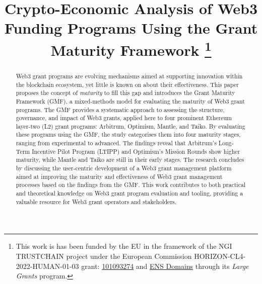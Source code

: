 \documentclass[conference]{IEEEtran}
\begin{document}
\title{Crypto-Economic Analysis of Web3 Funding Programs Using the Grant Maturity Framework
\thanks{This work is has been funded by the EU in the framework of the NGI TRUSTCHAIN project under the European Commission HORIZON-CL4-2022-HUMAN-01-03 grant: \href{https://cordis.europa.eu/project/id/101093274}{101093274} and \href{https://ens.domains/}{ENS Domains} through its \textit{Large Grants} program.}
}
\author{

\and
{}

\and
{}
}
\maketitle

\begin{abstract}
Web3 grant programs are evolving mechanisms aimed at supporting innovation within the blockchain ecosystem, yet little is known on about their effectiveness. This paper proposes the concept of \textit{maturity} to fill this gap and introduces the Grant Maturity Framework (GMF), a mixed-methods model for evaluating the maturity of Web3 grant programs. The GMF provides a systematic approach to assessing the structure, governance, and impact of Web3 grants, applied here to four prominent Ethereum layer-two (L2) grant programs: Arbitrum, Optimism, Mantle, and Taiko. By evaluating these programs using the GMF, the study categorises them into four maturity stages, ranging from experimental to advanced. The findings reveal that Arbitrum's Long-Term Incentive Pilot Program (LTIPP) and Optimism's Mission Rounds show higher maturity, while Mantle and Taiko are still in their early stages. The research concludes by discussing the user-centric development of a Web3 grant management platform aimed at improving the maturity and effectiveness of Web3 grant management processes based on the findings from the GMF. This work contributes to both practical and theoretical knowledge on Web3 grant program evaluation and tooling, providing a valuable resource for Web3 grant operators and stakeholders.
\end{abstract}
\end{document}
